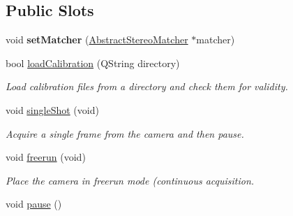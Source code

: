 \subsection*{Public Slots}
\begin{DoxyCompactItemize}
\item 
\hypertarget{class_abstract_stereo_camera_a1020509400c9e05350211784dd75f8a9}{}void {\bfseries set\+Matcher} (\hyperlink{class_abstract_stereo_matcher}{Abstract\+Stereo\+Matcher} $\ast$matcher)\label{class_abstract_stereo_camera_a1020509400c9e05350211784dd75f8a9}

\item 
bool \hyperlink{class_abstract_stereo_camera_ab4a1141a26a7ba82b6e1b133df41b670}{load\+Calibration} (Q\+String directory)
\begin{DoxyCompactList}\small\item\em Load calibration files from a directory and check them for validity. \end{DoxyCompactList}\item 
\hypertarget{class_abstract_stereo_camera_a11404be55831f47d0954a0c3c9e749b1}{}void \hyperlink{class_abstract_stereo_camera_a11404be55831f47d0954a0c3c9e749b1}{single\+Shot} (void)\label{class_abstract_stereo_camera_a11404be55831f47d0954a0c3c9e749b1}

\begin{DoxyCompactList}\small\item\em Acquire a single frame from the camera and then pause. \end{DoxyCompactList}\item 
\hypertarget{class_abstract_stereo_camera_a3b78f07ba45be840810876cfbe354ce8}{}void \hyperlink{class_abstract_stereo_camera_a3b78f07ba45be840810876cfbe354ce8}{freerun} (void)\label{class_abstract_stereo_camera_a3b78f07ba45be840810876cfbe354ce8}

\begin{DoxyCompactList}\small\item\em Place the camera in freerun mode (continuous acquisition. \end{DoxyCompactList}\item 
\hypertarget{class_abstract_stereo_camera_a0ae4bc133a396a7085b556a62aa9e6f1}{}void \hyperlink{class_abstract_stereo_camera_a0ae4bc133a396a7085b556a62aa9e6f1}{pause} ()\label{class_abstract_stereo_camera_a0ae4bc133a396a7085b556a62aa9e6f1}


\end{DoxyCompactItemize}

